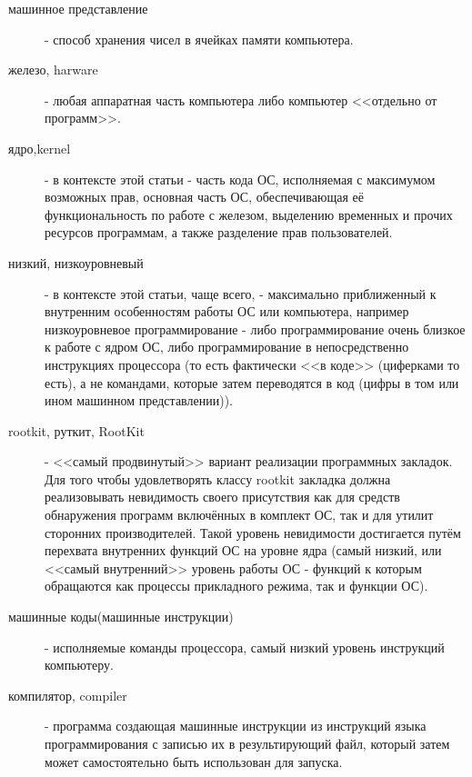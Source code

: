 \begin{description}
\item[машинное представление]
 - способ хранения чисел в ячейках памяти компьютера.

\item[железо, harware]
 - любая аппаратная часть компьютера либо компьютер <<отдельно
от программ>>.

\item[ядро,kernel]
 - в контексте этой статьи - часть кода ОС, исполняемая с максимумом
возможных прав, основная часть ОС, обеспечивающая её функциональность по работе
с железом, выделению временных и прочих ресурсов программам, а также разделение
прав пользователей.

\item[низкий, низкоуровневый]
 - в контексте этой статьи, чаще всего, - максимально  приближенный к внутренним
 особенностям работы ОС или компьютера, например  низкоуровневое программирование -
 либо программирование очень близкое к работе с ядром ОС, либо программирование в
 непосредственно инструкциях процессора (то есть фактически <<в коде>> (циферками
 то есть), а не командами, которые затем переводятся в код (цифры в том или ином
 машинном представлении)).

\item[rootkit, руткит, RootKit]
 - <<самый продвинутый>> вариант реализации программных закладок.
Для того чтобы удовлетворять классу rootkit закладка должна реализовывать
невидимость своего присутствия как для средств обнаружения программ включённых
в комплект ОС, так и для утилит сторонних производителей. Такой уровень
невидимости достигается путём перехвата внутренних функций ОС на уровне ядра (самый
низкий, или <<самый внутренний>> уровень работы ОС - функций к которым
обращаются как процессы прикладного режима, так и функции ОС).

\item[машинные коды(машинные инструкции)]
 - исполняемые команды процессора, самый низкий уровень
инструкций компьютеру.

\item[компилятор, compiler]
 - программа создающая машинные инструкции из инструкций
языка программирования с записью их в результирующий файл, который затем может самостоятельно
быть  использован для запуска.


\end{description}

